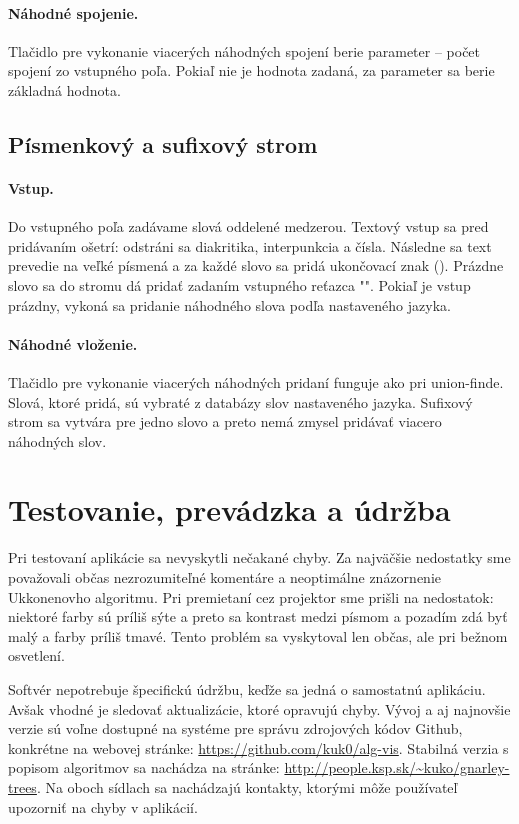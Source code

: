 \paragraph{Náhodné spojenie.} Tlačidlo pre vykonanie viacerých náhodných 
spojení berie parameter -- počet spojení zo vstupného poľa. Pokiaľ nie je 
hodnota zadaná, za parameter sa berie základná hodnota.

\subsection{Písmenkový a sufixový strom}

\paragraph{Vstup.} Do vstupného poľa zadávame slová oddelené medzerou. Textový 
vstup sa pred pridávaním ošetrí: odstráni sa diakritika, interpunkcia a čísla. 
Následne sa text prevedie na veľké písmená a za každé slovo sa pridá 
ukončovací znak (\uz). Prázdne slovo sa do stromu dá pridať zadaním vstupného 
reťazca "\uz". Pokiaľ je vstup prázdny, vykoná sa pridanie náhodného slova 
podľa nastaveného jazyka.

\paragraph{Náhodné vloženie.} Tlačidlo pre vykonanie viacerých náhodných 
pridaní funguje ako pri union-finde. Slová, ktoré pridá, sú vybraté z databázy 
slov nastaveného jazyka. Sufixový strom sa vytvára pre jedno slovo a preto 
nemá zmysel pridávať viacero náhodných slov.


\section{Testovanie, prevádzka a údržba}\label{sec:im:test}

Pri testovaní aplikácie sa nevyskytli nečakané chyby. Za najväčšie nedostatky 
sme považovali občas nezrozumiteľné komentáre a neoptimálne znázornenie 
Ukkonenovho algoritmu. Pri premietaní cez projektor sme prišli na nedostatok: 
niektoré farby sú príliš sýte a preto sa kontrast medzi písmom a pozadím zdá 
byť malý a farby príliš tmavé. Tento problém sa vyskytoval len občas, ale 
pri bežnom osvetlení.

Softvér nepotrebuje špecifickú údržbu, keďže sa jedná o samostatnú aplikáciu. 
Avšak vhodné je sledovať aktualizácie, ktoré opravujú chyby. Vývoj a aj 
najnovšie verzie sú voľne dostupné na systéme pre správu zdrojových kódov 
Github, konkrétne na webovej stránke: \url{https://github.com/kuk0/alg-vis}. 
Stabilná verzia s popisom algoritmov sa nachádza na stránke: 
\url{http://people.ksp.sk/~kuko/gnarley-trees}. Na oboch sídlach sa nachádzajú 
kontakty, ktorými môže používateľ upozorniť na chyby v aplikácií.


